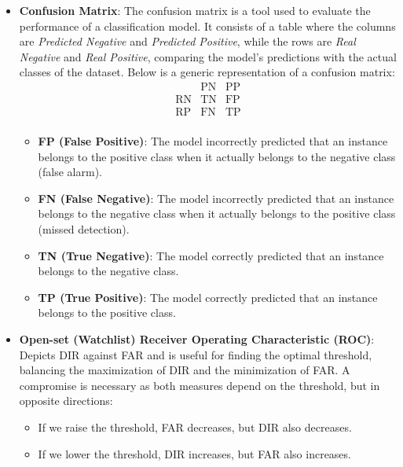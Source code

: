 \begin{itemize}
    \item \textbf{Confusion Matrix}:  
    The confusion matrix is a tool used to evaluate the performance of a classification model. It consists of a table where the columns are \textit{Predicted Negative} and \textit{Predicted Positive}, while the rows are \textit{Real Negative} and \textit{Real Positive}, comparing the model's predictions with the actual classes of the dataset. Below is a generic representation of a confusion matrix:
    \[
    \begin{array}{c|c|c}
          & \text{PN} & \text{PP} \\ \hline
        \text{RN} & \text{TN} & \text{FP} \\ 
        \text{RP} & \text{FN} & \text{TP} \\
    \end{array}
    \]
  
    \begin{itemize}
        \item \textbf{FP (False Positive)}:  
        The model incorrectly predicted that an instance belongs to the positive class when it actually belongs to the negative class (false alarm).
        
        \item \textbf{FN (False Negative)}:  
        The model incorrectly predicted that an instance belongs to the negative class when it actually belongs to the positive class (missed detection).
        
        \item \textbf{TN (True Negative)}:  
        The model correctly predicted that an instance belongs to the negative class.
        
        \item \textbf{TP (True Positive)}:  
        The model correctly predicted that an instance belongs to the positive class.
    \end{itemize}

    \item \textbf{Open-set (Watchlist) Receiver Operating Characteristic (ROC)}: Depicts DIR against FAR and is useful for finding the optimal threshold, balancing the maximization of DIR and the minimization of FAR. A compromise is necessary as both measures depend on the threshold, but in opposite directions:
    \begin{itemize}
        \item If we raise the threshold, FAR decreases, but DIR also decreases.
        \item If we lower the threshold, DIR increases, but FAR also increases.
    \end{itemize}

\end{itemize}

